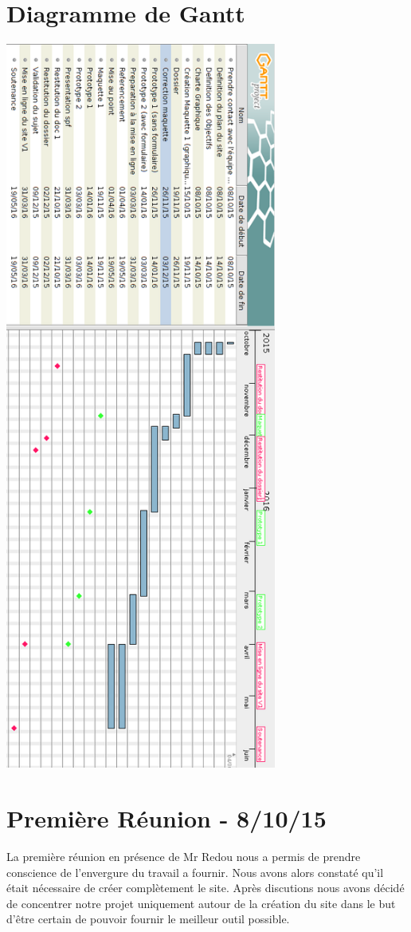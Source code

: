 \documentclass[a4paper, 12pt]{report}
\begin{document}
\section{Diagramme de Gantt}
\includegraphics[height=24cm]{gantt.png}
\newpage
\section{Première Réunion - 8/10/15}
La première réunion en présence de Mr Redou nous a permis de prendre conscience de l'envergure du travail a fournir. Nous avons alors constaté qu'il était nécessaire de créer complètement le site. Après discutions nous avons décidé de concentrer notre projet uniquement autour de la création du site dans le but d’être certain de pouvoir fournir le meilleur outil possible.
\end{document}
